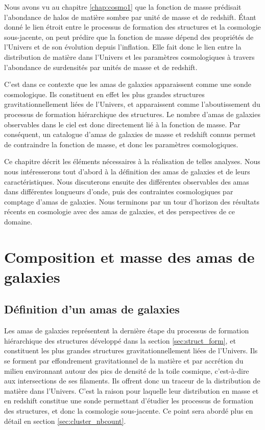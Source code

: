 Nous avons vu au chapitre \ref{chap:cosmo1} que la fonction de masse prédisait l'abondance de halos de matière sombre par unité de masse et de redshift.
Étant donné le lien étroit entre le processus de formation des structures et la cosmologie sous-jacente, on peut prédire que la fonction de masse dépend des propriétés de l'Univers et de son évolution depuis l'inflation.
Elle fait donc le lien entre la distribution de matière dans l'Univers et les paramètres cosmologiques à travers l'abondance de surdensités par unités de masse et de redshift.

C'est dans ce contexte que les amas de galaxies apparaissent comme une sonde cosmologique.
Ils constituent en effet les plus grandes structures gravitationnellement liées de l'Univers, et apparaissent comme l'aboutissement du processus de formation hiérarchique des structures.
Le nombre d'amas de galaxies observables dans le ciel est donc directement lié à la fonction de masse.
Par conséquent, un catalogue d'amas de galaxies de masse et redshift connus permet de   contraindre la fonction de masse, et donc les paramètres cosmologiques.

Ce chapitre décrit les éléments nécessaires à la réalisation de telles analyses.
Nous nous intéresserons tout d'abord à la définition des amas de galaxies et de leurs caractéristiques.
Nous discuterons ensuite des différentes observables des amas dans différentes longueurs d'onde, puis des contraintes cosmologiques par comptage d'amas de galaxies.
Nous terminons par un tour d'horizon des résultats récents en cosmologie avec des amas de galaxies, et des perspectives de ce domaine.

\section{Composition et masse des amas de galaxies}

\subsection{Définition d'un amas de galaxies}

Les amas de galaxies représentent la dernière étape du processus de formation hiérarchique des structures développé dans la section \ref{sec:struct_form}, et constituent les plus grandes structures gravitationnellement liées de l'Univers.
Ils se forment par effondrement gravitationnel de la matière et par accrétion du milieu environnant autour des pics de densité de la toile cosmique, c'est-à-dire aux intersections de ses filaments.
Ils offrent donc un traceur de la distribution de matière dans l'Univers.
C'est la raison pour laquelle leur distribution en masse et en redshift constitue une sonde permettant d'étudier les processus de formation des structures, et donc la cosmologie sous-jacente.
Ce point sera abordé plus en détail en section \ref{sec:cluster_nbcount}.

